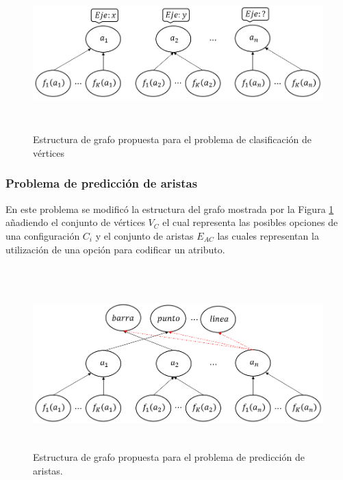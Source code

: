 \begin{center}
    \begin{figure}[h!]
        \centering
        \includegraphics[width=130mm, height=60mm]{Graphics/graph_class_kg.png}
        \caption{Estructura de grafo propuesta para el problema de clasificaci\'on de v\'ertices}
        \label{fig: graph-struct}
    \end{figure}
\end{center}




\subsubsection{Problema de predicci\'on de aristas}

En este problema se modific\'o la estructura del grafo mostrada por la Figura \ref{fig: graph-struct}
a\~nadiendo el conjunto de v\'ertices $V_C$ el cual representa las posibles opciones de una configuraci\'on $C_i$ y
el conjunto de aristas $E_{AC}$ las cuales representan la utilizaci\'on de una opci\'on para codificar un atributo.\\\\

\begin{figure}[h!]
    \centering
    \includegraphics[width=130mm, height=65mm]{Graphics/link_pred_kg.png}
    \caption{Estructura de grafo propuesta para el problema de predicci\'on de aristas.}
    \label{fig: link-pred-graph}
\end{figure}

